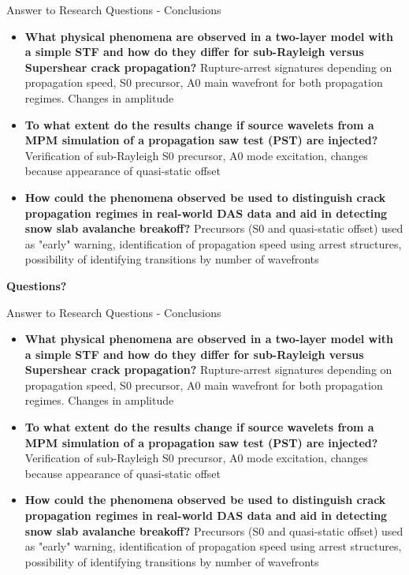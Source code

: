 \documentclass[11pt,aspectratio=169]{beamer}
\begin{document}
\begin{frame}{Answer to Research Questions - Conclusions}
     \begin{itemize}
        \item \textbf{What physical phenomena are observed in a two-layer model with a simple STF and how do they differ for sub-Rayleigh versus Supershear crack propagation?} Rupture-arrest signatures depending on propagation speed, S0 precursor, A0 main wavefront for both propagation regimes. Changes in amplitude
        \item \textbf{To what extent do the results change if source wavelets from a MPM simulation of a propagation saw test (PST) are injected?} Verification of sub-Rayleigh S0 precursor, A0 mode excitation, changes because appearance of quasi-static offset
        \item \textbf{How could the phenomena observed be used to distinguish crack propagation regimes in real-world DAS data and aid in detecting snow slab avalanche breakoff?} Precursors (S0 and quasi-static offset) used as "early" warning, identification of propagation speed using arrest structures, possibility of identifying transitions by number of wavefronts
    \end{itemize}
    
\end{frame}

\begin{frame}
    \begin{center}
       \huge{\textbf{Questions?}} 
    \end{center}
    
\end{frame}

\begin{frame}{Answer to Research Questions - Conclusions}
     \begin{itemize}
        \item \textbf{What physical phenomena are observed in a two-layer model with a simple STF and how do they differ for sub-Rayleigh versus Supershear crack propagation?} Rupture-arrest signatures depending on propagation speed, S0 precursor, A0 main wavefront for both propagation regimes. Changes in amplitude
        \item \textbf{To what extent do the results change if source wavelets from a MPM simulation of a propagation saw test (PST) are injected?} Verification of sub-Rayleigh S0 precursor, A0 mode excitation, changes because appearance of quasi-static offset
        \item \textbf{How could the phenomena observed be used to distinguish crack propagation regimes in real-world DAS data and aid in detecting snow slab avalanche breakoff?} Precursors (S0 and quasi-static offset) used as "early" warning, identification of propagation speed using arrest structures, possibility of identifying transitions by number of wavefronts
    \end{itemize}
    
\end{frame}
\end{document}
